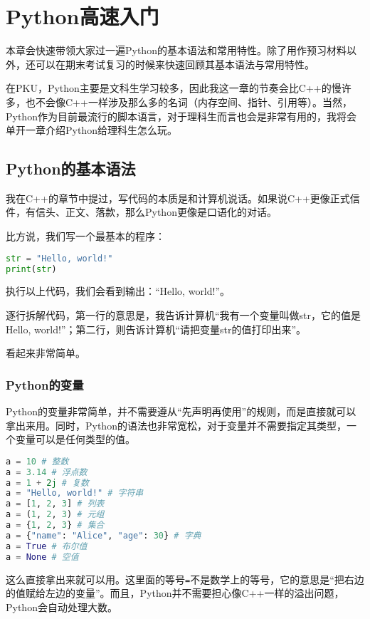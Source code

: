 \documentclass[../main.tex]{subfiles}
\begin{document}
\chapter{Python高速入门}

本章会快速带领大家过一遍Python的基本语法和常用特性。除了用作预习材料以外，还可以在期末考试复习的时候来快速回顾其基本语法与常用特性。

在PKU，Python主要是文科生学习较多，因此我这一章的节奏会比C++的慢许多，也不会像C++一样涉及那么多的名词（内存空间、指针、引用等）。当然，Python作为目前最流行的脚本语言，对于理科生而言也会是非常有用的，我将会单开一章介绍Python给理科生怎么玩。

\section{Python的基本语法}

我在C++的章节中提过，写代码的本质是和计算机说话。如果说C++更像正式信件，有信头、正文、落款，那么Python更像是口语化的对话。

比方说，我们写一个最基本的程序：

\begin{lstlisting}[language=python]
str = "Hello, world!"
print(str)
\end{lstlisting}

执行以上代码，我们会看到输出：“Hello, world!”。

逐行拆解代码，第一行的意思是，我告诉计算机“我有一个变量叫做str，它的值是Hello, world!”；第二行，则告诉计算机“请把变量str的值打印出来”。

看起来非常简单。

\subsection{Python的变量}

Python的变量非常简单，并不需要遵从“先声明再使用”的规则，而是直接就可以拿出来用。同时，Python的语法也非常宽松，对于变量并不需要指定其类型，一个变量可以是任何类型的值。

\begin{lstlisting}[language=python]
a = 10 # 整数
a = 3.14 # 浮点数
a = 1 + 2j # 复数
a = "Hello, world!" # 字符串
a = [1, 2, 3] # 列表
a = (1, 2, 3) # 元组
a = {1, 2, 3} # 集合
a = {"name": "Alice", "age": 30} # 字典
a = True # 布尔值
a = None # 空值
\end{lstlisting}
这么直接拿出来就可以用。这里面的等号\texttt{=}不是数学上的等号，它的意思是“把右边的值赋给左边的变量”。而且，Python并不需要担心像C++一样的溢出问题，Python会自动处理大数。
\end{document}
